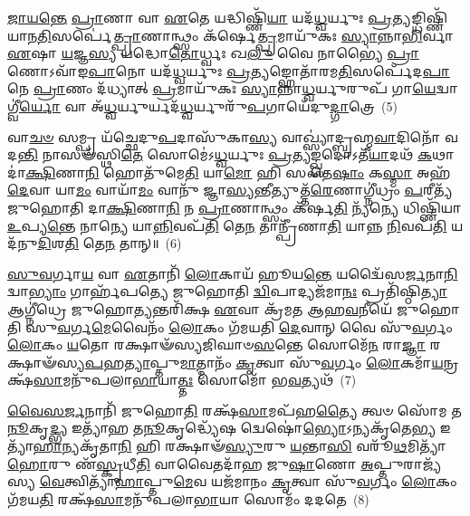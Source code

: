 \-\ul{𑌜𑌾}\-\-\ul{𑌯}\-\-\ul{𑌨𑍍𑌤𑍇} \ul{𑌪𑍍𑌰𑌾}\-𑌣𑌾 𑌵𑌾 \ul{𑌏}\-𑌤𑍇 𑌯𑌦𑍍𑌧𑌿𑌷𑍍𑌣𑌿᳴\-\ul{𑌯𑌾} 𑌯𑌦᳴\-\ul{𑌧𑍍𑌵}\-𑌰𑍍𑌯𑍁𑌃 \ul{𑌪𑍍𑌰}\-𑌤𑍍𑌯𑌙𑍍𑌧𑌿𑌷𑍍𑌣𑌿᳴𑌯𑌾𑌨\-\ul{𑌤𑌿}\-𑌸𑌰𑍍𑌪𑍇॑\-\ul{𑌤𑍍𑌪𑍍𑌰𑌾}\-𑌣𑌾𑌨𑍍𑌥𑍍𑌸𑌂 𑌕᳴𑌰𑍍\mbox{}𑌷𑍇\-\ul{𑌤𑍍𑌪𑍍𑌰}\-𑌮𑌾𑌯𑍁᳴𑌕𑌃 \ul{𑌸𑍍𑌯𑌾}\-𑌨𑍍𑌨𑌾\-\ul{𑌭𑌿}\-𑌰𑍍𑌵𑌾 \ul{𑌏}\-𑌷𑌾 \ul{𑌯}\-𑌜𑍍𑌞\-\ul{𑌸𑍍𑌯} 𑌯𑌦𑍍𑌧𑍋\-\ul{𑌤𑍋}\-𑌰𑍍𑌧𑍍𑌵𑌃 𑌖\-\ul{𑌲𑍁} 𑌵𑍈 𑌨𑌾𑌭𑍍𑌯𑍈॑ \ul{𑌪𑍍𑌰𑌾}\-𑌣𑍋\-𑌽𑌵𑌾᳴𑌙\-\ul{𑌪𑌾}\-𑌨𑍋 𑌯𑌦᳴\-\ul{𑌧𑍍𑌵}\-𑌰𑍍𑌯𑍁𑌃 \ul{𑌪𑍍𑌰}\-𑌤𑍍𑌯𑌙𑍍𑌹𑍋𑌤𑌾᳴𑌰𑌮\-\ul{𑌤𑌿}\-𑌸𑌰𑍍𑌪𑍇᳴𑌦\-\ul{𑌪𑌾}\-𑌨𑍇 \ul{𑌪𑍍𑌰𑌾}\-𑌣𑌂 𑌦᳴𑌧𑍍𑌯𑌾𑌤𑍍 \ul{𑌪𑍍𑌰}\-𑌮𑌾𑌯𑍁᳴𑌕𑌃 \ul{𑌸𑍍𑌯𑌾}\-𑌨𑍍𑌨𑌾\-\ul{𑌧𑍍𑌵}\-𑌰𑍍𑌯𑍁𑌰𑍁𑌪᳴ 𑌗𑌾\-\ul{𑌯𑍇}\-𑌦𑍍𑌵𑌾𑌗𑍍𑌵𑍀॑\-\ul{𑌰𑍍𑌯𑍋} 𑌵𑌾 𑌅᳴\-\ul{𑌧𑍍𑌵}\-𑌰𑍍𑌯𑍁𑌰𑍍𑌯𑌦᳴\-\ul{𑌧𑍍𑌵}\-𑌰𑍍𑌯𑍁𑌰𑍁᳴\-\ul{𑌪}\-𑌗𑌾𑌯𑍇᳴𑌦𑍁\-\ul{𑌦𑍍𑌗𑌾}\-𑌤𑍍𑌰𑍇~(5)

𑌵𑌾\-\ul{𑌚}\-\-\ul{𑍞} 𑌸𑌮𑍍𑌪𑍍𑌰 𑌯᳴𑌚𑍍𑌛𑍇𑌦𑍁\-\ul{𑌪}\-𑌦𑌾𑌸𑍁᳴𑌕𑌾\-\ul{𑌸𑍍𑌯} 𑌵𑌾𑌖𑍍𑌸𑍍𑌯𑌾॑𑌦𑍍𑌬𑍍𑌰𑌹𑍍𑌮\-\ul{𑌵𑌾}\-𑌦𑌿𑌨𑍋᳴ 𑌵𑌦\-\ul{𑌨𑍍𑌤𑌿} 𑌨𑌾𑌸𑍟᳴𑌸𑍍𑌥𑌿\-\ul{𑌤𑍇} 𑌸𑍋𑌮𑍇॑\-𑌽\-\ul{𑌧𑍍𑌵}\-𑌰𑍍𑌯𑍁𑌃 \ul{𑌪𑍍𑌰}\-𑌤𑍍𑌯𑌙𑍍𑌖𑍍𑌸𑌦𑍋\-𑌽𑌤𑍀᳴\-\ul{𑌯𑌾}\-𑌦𑌥᳴ \ul{𑌕}\-𑌥𑌾 𑌦𑌾॑\-\ul{𑌕𑍍𑌷𑌿}\-𑌣𑌾\-\ul{𑌨𑌿} 𑌹𑍋𑌤𑍁᳴𑌮𑍇\-\ul{𑌤𑌿} 𑌯𑌾\-\ul{𑌮𑍋} 𑌹𑌿 𑌸 𑌤𑍇\-\ul{𑌷𑌾𑌂} 𑌕\-\ul{𑌸𑍍𑌮𑌾} 𑌅𑌹᳴ \ul{𑌦𑍇}\-𑌵𑌾 𑌯𑌾\-\ul{𑌮𑌂} 𑌵𑌾𑌯𑌾᳴\-\ul{𑌮𑌂} 𑌵𑌾𑌨𑍁᳴ 𑌜𑍍𑌞𑌾\-\ul{𑌸𑍍𑌯}\-𑌨𑍍𑌤𑍀𑌤𑍍𑌯𑍁𑌤𑍍𑌤᳴\-\ul{𑌰𑍇}\-𑌣𑌾𑌗𑍍𑌨𑍀॑𑌧𑍍𑌰𑌂 \ul{𑌪}\-𑌰𑍀𑌤𑍍𑌯᳴ 𑌜𑍁𑌹𑍋𑌤𑌿 𑌦𑌾\-\ul{𑌕𑍍𑌷𑌿}\-𑌣𑌾\-\ul{𑌨𑌿} 𑌨 \ul{𑌪𑍍𑌰𑌾}\-𑌣𑌾𑌨𑍍𑌥𑍍𑌸𑌂 𑌕᳴𑌰𑍍\mbox{}𑌷\-\ul{𑌤𑌿} 𑌨𑍍𑌯᳴𑌨𑍍𑌯𑍇 𑌧𑌿𑌷𑍍𑌣𑌿᳴𑌯𑌾 \ul{𑌉}\-𑌪𑍍𑌯\-\ul{𑌨𑍍𑌤𑍇} 𑌨𑌾𑌨𑍍𑌯𑍇 𑌯𑌾\-\ul{𑌨𑍍𑌨𑌿}\-𑌵𑌪᳴\-\ul{𑌤𑌿} 𑌤𑍇\-\ul{𑌨} 𑌤𑌾𑌨𑍍𑌪𑍍𑌰𑍀᳴𑌣𑌾\-\ul{𑌤𑌿} 𑌯𑌾𑌨𑍍𑌨 \ul{𑌨𑌿}\-𑌵𑌪᳴\-\ul{𑌤𑌿} 𑌯𑌦᳴𑌨𑍁\-\ul{𑌦𑌿}\-𑌶\-\ul{𑌤𑌿} 𑌤𑍇\-\ul{𑌨} 𑌤𑌾𑌨𑍍॥~(6)

{\anuvakamend[{\-\ul{𑌸𑍍𑌤𑍁}\-𑌤𑍇 \ul{𑌵𑌿}\-𑌨𑍍𑌦\-\ul{𑌤𑍇} 𑌹𑌿 𑌵𑍀᳴𑌯𑌨𑍍𑌤𑍇 \ul{𑌪𑍍𑌰}\-𑌤𑍀𑌚𑍀᳴𑌰𑍁\-\ul{𑌦𑍍𑌗𑌾}\-𑌤𑍍𑌰 \ul{𑌉}\-𑌪𑍍𑌯\-\ul{𑌨𑍍𑌤𑍇} 𑌚𑌤𑍁᳴𑌰𑍍𑌦𑌶 𑌚}]}%

\-\ul{𑌸𑍁}\-\-\ul{𑌵}\-𑌰𑍍𑌗𑌾\-\ul{𑌯} 𑌵𑌾 \ul{𑌏}\-𑌤𑌾𑌨𑌿᳴ \ul{𑌲𑍋}\-𑌕𑌾𑌯᳴ 𑌹𑍂𑌯\-\ul{𑌨𑍍𑌤𑍇} 𑌯𑌦𑍍𑌵𑍈᳴𑌸\-\ul{𑌰𑍍𑌜}\-𑌨𑌾\-\ul{𑌨𑌿} 𑌦𑍍𑌵𑌾\-\ul{𑌭𑍍𑌯𑌾𑌂} 𑌗𑌾𑌰𑍍\mbox{}𑌹᳴𑌪𑌤𑍍𑌯𑍇 𑌜𑍁𑌹𑍋𑌤𑌿 \ul{𑌦𑍍𑌵𑌿}\-𑌪𑌾𑌦𑍍𑌯𑌜᳴𑌮𑌾\-\ul{𑌨𑌃} 𑌪𑍍𑌰𑌤𑌿᳴𑌷𑍍𑌠𑌿\-\ul{𑌤𑍍𑌯𑌾} 𑌆𑌗𑍍𑌨𑍀॑𑌧𑍍𑌰𑍇 𑌜𑍁𑌹𑍋\-\ul{𑌤𑍍𑌯}\-𑌨𑍍𑌤𑌰𑌿᳴𑌕𑍍𑌷 \ul{𑌏}\-𑌵𑌾 𑌕𑍍𑌰᳴𑌮𑌤 𑌆𑌹\-\ul{𑌵}\-𑌨𑍀𑌯𑍇᳴ 𑌜𑍁𑌹𑍋𑌤𑌿 𑌸𑍁\-\ul{𑌵}\-𑌰𑍍𑌗\-\ul{𑌮𑍇}\-𑌵𑍈𑌨𑌂᳴ \ul{𑌲𑍋}\-𑌕𑌂 𑌗᳴𑌮𑌯𑌤𑌿 \ul{𑌦𑍇}\-𑌵𑌾𑌨𑍍 𑌵𑍈 𑌸𑍁᳴\-\ul{𑌵}\-𑌰𑍍𑌗𑌂 \ul{𑌲𑍋}\-𑌕𑌂 \ul{𑌯}\-𑌤𑍋 𑌰𑌕𑍍𑌷𑌾𑍟᳴𑌸𑍍𑌯𑌜𑌿𑌘𑌾𑍞\-\ul{𑌸}\-𑌨𑍍𑌤𑍇 𑌸𑍋𑌮𑍇᳴\-\ul{𑌨} 𑌰𑌾\-\ul{𑌜𑍍𑌞𑌾} 𑌰𑌕𑍍𑌷𑌾𑍟᳴𑌸𑍍𑌯\-\ul{𑌪}\-𑌹\-\ul{𑌤𑍍𑌯𑌾}\-𑌪𑍍𑌤𑍁\-\ul{𑌮𑌾}\-𑌤𑍍𑌮𑌾𑌨𑌂᳴ \ul{𑌕𑍃}\-𑌤𑍍𑌵𑌾 𑌸𑍁᳴\-\ul{𑌵}\-𑌰𑍍𑌗𑌂 \ul{𑌲𑍋}\-𑌕𑌮𑌾᳴\-\ul{𑌯}\-𑌨𑍍𑌰𑌕𑍍𑌷᳴\-\ul{𑌸𑌾}\-𑌮𑌨𑍁᳴𑌪𑌲𑌾\-\ul{𑌭𑌾}\-𑌯𑌾\-\ul{𑌤𑍍𑌤𑌃} 𑌸𑍋𑌮𑍋᳴ 𑌭\-\ul{𑌵}\-𑌤𑍍𑌯𑌥᳴~(7)

\-\ul{𑌵𑍈}\-\-\ul{𑌸}\-\-\ul{𑌰𑍍𑌜}\-𑌨𑌾𑌨𑌿᳴ 𑌜𑍁𑌹𑍋\-\ul{𑌤𑌿} 𑌰𑌕𑍍𑌷᳴\-\ul{𑌸𑌾}\-𑌮𑌪᳴𑌹\-\ul{𑌤𑍍𑌯𑍈} 𑌤𑍍𑌵𑍞 𑌸𑍋᳴𑌮 𑌤\-\ul{𑌨𑍂}\-𑌕𑍃\-\ul{𑌦𑍍𑌭𑍍𑌯} 𑌇𑌤𑍍𑌯𑌾᳴𑌹 𑌤\-\ul{𑌨𑍂}\-𑌕𑍃𑌦𑍍𑌧𑍍𑌯𑍇᳴𑌷 𑌦𑍍𑌵𑍇𑌷𑍋॑\-\ul{𑌭𑍍𑌯𑍋}\-\-𑌽𑌨𑍍𑌯𑌕𑍃᳴𑌤𑍇\-\ul{𑌭𑍍𑌯} 𑌇𑌤𑍍𑌯𑌾᳴\-\ul{𑌹𑌾}\-𑌨𑍍𑌯𑌕𑍃᳴𑌤𑌾\-\ul{𑌨𑌿} 𑌹𑌿 𑌰𑌕𑍍𑌷𑌾𑍟᳴\-\ul{𑌸𑍍𑌯𑍁}\-𑌰𑍁 \ul{𑌯}\-𑌨𑍍𑌤𑌾\-\ul{𑌸𑌿} 𑌵𑌰𑍂᳴\-\ul{𑌥}\-𑌮𑌿𑌤𑍍𑌯𑌾᳴\-\ul{𑌹𑍋}\-𑌰𑍁 𑌣᳴\-\ul{𑌸𑍍𑌕𑍃}\-𑌧𑍀\-\ul{𑌤𑌿} 𑌵𑌾𑌵𑍈𑌤𑌦𑌾᳴𑌹 𑌜𑍁\-\ul{𑌷𑌾}\-𑌣𑍋 \ul{𑌅}\-𑌪𑍍𑌤𑍁𑌰𑌾𑌜𑍍𑌯᳴𑌸𑍍𑌯 \ul{𑌵𑍇}\-𑌤𑍍𑌵𑌿𑌤𑍍𑌯𑌾᳴\-\ul{𑌹𑌾}\-𑌪𑍍𑌤𑍁\-\ul{𑌮𑍇}\-𑌵 𑌯𑌜᳴𑌮𑌾𑌨𑌂 \ul{𑌕𑍃}\-𑌤𑍍𑌵𑌾 𑌸𑍁᳴\-\ul{𑌵}\-𑌰𑍍𑌗𑌂 \ul{𑌲𑍋}\-𑌕𑌂 𑌗᳴𑌮𑌯\-\ul{𑌤𑌿} 𑌰𑌕𑍍𑌷᳴\-\ul{𑌸𑌾}\-𑌮𑌨𑍁᳴𑌪𑌲𑌾\-\ul{𑌭𑌾}\-𑌯𑌾 𑌸𑍋𑌮𑌂᳴ 𑌦𑌦𑌤𑍇~(8)

